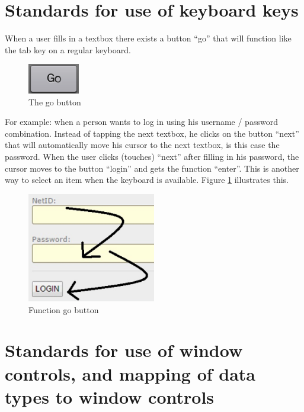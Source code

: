\documentclass[11pt, a4paper,svglistings]{report}
\begin{document}
\section{Standards for use of keyboard keys}

When a user fills in a textbox there exists a button ``go'' that will function like the tab key on a regular keyboard.

\begin{figure}[H]
\centering
    \includegraphics[width=0.2\textwidth]{GO.png}
  \caption[Go button]{The go button}
\end{figure}

\newpage

For example: when a person wants to log in using his username / password combination. Instead of tapping the next textbox, he clicks on the button ``next'' that will automatically move his cursor to the next textbox, is this case the password. When the user clicks (touches) ``next'' after filling in his password, the cursor moves to the button ``login'' and gets the function ``enter''. This is another way to select an item when the keyboard is available. Figure \ref{fig:function} illustrates this.

\begin{figure}[H]
\centering
    \includegraphics[width=0.5\textwidth]{GO2.png}
  \caption[Function go button]{\label{fig:function}Function go button}
\end{figure}

\section{Standards for use of window controls, and mapping of data types to window controls}
\end{document}
